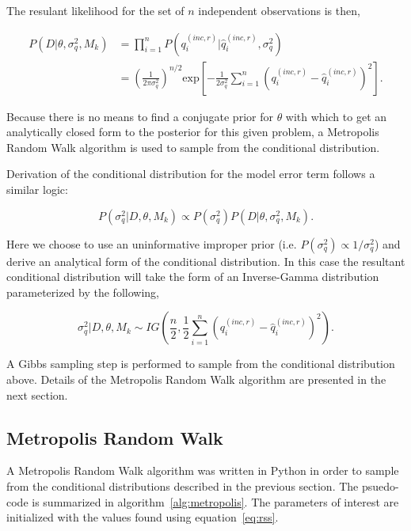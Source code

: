 \documentclass[article]{proc}
\begin{document}
        \noindent The resulant likelihood for the set of $n$ independent observations is then,

        \begin{align}\label{eq:likelihood_2}
            P(D| \theta, \sigma_q^2, M_k) &= \prod_{i=1}^n P(q_i^{(inc,r)}| \hat{q}_i^{(inc,r)}, \sigma_q^2) \\
            &= \left(\frac{1}{2 \pi \sigma_q^2} \right)^{n/2} \text{exp} \left[-\frac{1}{2 \sigma_q^2} \sum_{i=1}^n \left(q_i^{(inc,r)} - \hat{q}_i^{(inc,r)} \right)^2 \right].
        \end{align}

        \noindent Because there is no means to find a conjugate prior for $\theta$ with which to get an analytically closed form to the posterior for this given problem, a Metropolis Random Walk algorithm is used to sample from the conditional distribution.

        Derivation of the conditional distribution for the model error term follows a similar logic:

        \begin{equation}\label{eq:sigma_q}
            P(\sigma_q^2 | D, \theta, M_k) \propto P(\sigma_q^2) P(D| \theta, \sigma_q^2, M_k).
        \end{equation}

        \noindent Here we choose to use an uninformative improper prior (i.e. $P(\sigma_q^2) \propto 1/\sigma_q^2$) and derive an analytical form of the conditional distribution. In this case the resultant conditional distribution will take the form of an Inverse-Gamma distribution parameterized by the following,

        \begin{equation}\label{eq:sigma_q_conditional}
            \sigma_q^2 | D, \theta, M_k \sim IG \left(\frac{n}{2},  \frac{1}{2}\sum_{i=1}^n \left(q_i^{(inc,r)} - \hat{q}_i^{(inc,r)} \right)^2\right).
        \end{equation}

        \noindent A Gibbs sampling step is performed to sample from the conditional distribution above. Details of the Metropolis Random Walk algorithm are presented in the next section.

    \subsection{Metropolis Random Walk}

        A Metropolis Random Walk algorithm was written in Python in order to sample from the conditional distributions described in the previous section. The psuedo-code is summarized in algorithm~\ref{alg:metropolis}. The parameters of interest are initialized with the values found using equation~\ref{eq:rss}.   
\end{document}
